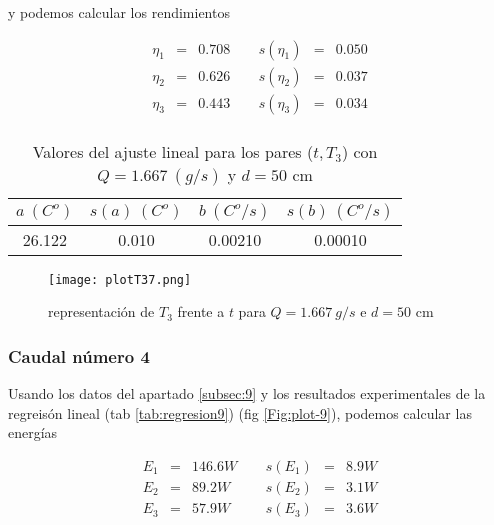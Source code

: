 \documentclass[12pt,a4paper]{article}
\begin{document}
 y podemos calcular los rendimientos 
 
\begin{equation} 
\begin{array}{lllllll}
\eta_1 & = & 0.708  &  \ \ &  s(\eta_1) & =  & 0.050   \\ 
 \eta_2 & = & 0.626  &  \ \ &  s(\eta_2) & =  & 0.037   \\ 
 \eta_3 & = & 0.443  &  \ \ &  s(\eta_3) & =  & 0.034   \\ 
 \end{array} 
\end{equation} 
 
 \begin{table}[h!] 	 \centering 
\begin{tabular}{|c|c|c|c|} 
\hline 
$a \ (C^o)$ & $s(a) \ (C^o)$ & $ b \ (C^o/s)$ & $s(b) \ (C^o/s)$  \\ \hline 
26.122  & 0.010 &  0.00210 & 0.00010 \\ 
\hline
\end{tabular} 
\caption{Valores del ajuste lineal para los pares ($t,T_3$) con $Q=1.667 \ (g/s)$ y $d= 50 $ cm} 
\label{tab:regresion8} 
\end{table} 
 
 
\begin{figure}[h!] 	 \centering 
\texttt{[image: plotT37.png]} 
\caption{representación de $T_3$ frente a $t$ para $Q = 1.667 \ g/s$ e $d = 50$ cm} 
\label{Fig:plot-8}  
\end{figure} 
 
\newpage 
 
 
 
 
\subsubsection{Caudal número 4} 
 
Usando los datos del apartado \ref{subsec:9} y los  resultados experimentales de la regreisón lineal (tab \ref{tab:regresion9}) (fig \ref{Fig:plot-9}), podemos calcular las energías 
 
 \begin{equation} 
\begin{array}{lllllll}
E_1 & = & 146.6 W &  \ \ &  s(E_1) & =  & 8.9  W \\ 
 E_2 & = & 89.2 W &  \ \ &  s(E_2) & =  & 3.1  W \\ 
 E_3 & = & 57.9 W &  \ \ &  s(E_3) & =  & 3.6  W \\ 
 \end{array} 
\end{equation} 
 
\end{document}
